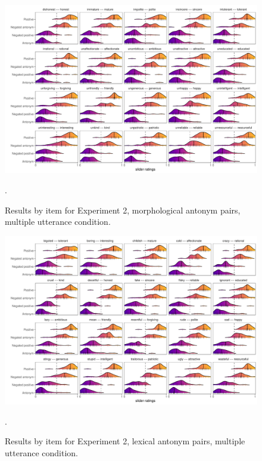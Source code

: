 \documentclass[floatsintext,doc]{apa6}
\begin{document}
\begin{figure}[t]
\centering \includegraphics{figs/cogsci_expt2_morph_multiUtt_byItem_densities.pdf} 
\caption{Results by item for Experiment 2, morphological antonym pairs, multiple utterance condition.}.\label{fig:items_morph_multiUtt_expt2}
\end{figure}

\begin{figure}[t]
\centering \includegraphics{figs/cogsci_expt2_lex_multiUtt_byItem_densities.pdf} 
\caption{Results by item for Experiment 2, lexical antonym pairs, multiple utterance condition.}.\label{fig:items_lex_multiUtt_expt2}
\end{figure}


\end{document}
